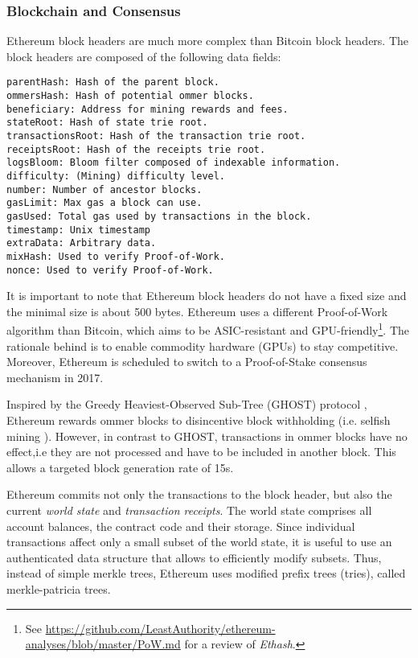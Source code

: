 \subsubsection{Blockchain and Consensus}

Ethereum block headers are much more complex than Bitcoin block headers. The block headers are composed of the following data fields:
\begin{lstlisting}[breaklines]
parentHash: Hash of the parent block.
ommersHash: Hash of potential ommer blocks.
beneficiary: Address for mining rewards and fees.
stateRoot: Hash of state trie root.
transactionsRoot: Hash of the transaction trie root.
receiptsRoot: Hash of the receipts trie root.
logsBloom: Bloom filter composed of indexable information.
difficulty: (Mining) difficulty level.
number: Number of ancestor blocks.
gasLimit: Max gas a block can use.
gasUsed: Total gas used by transactions in the block.
timestamp: Unix timestamp
extraData: Arbitrary data.
mixHash: Used to verify Proof-of-Work.
nonce: Used to verify Proof-of-Work.
\end{lstlisting}
It is important to note that Ethereum block headers do not have a fixed size and the minimal size is about 500 bytes. Ethereum uses a different Proof-of-Work algorithm than Bitcoin, which aims to be ASIC-resistant and GPU-friendly\footnote{See \url{https://github.com/LeastAuthority/ethereum-analyses/blob/master/PoW.md} for a review of \emph{Ethash}.}. The rationale behind is to enable commodity hardware (GPUs) to stay competitive. Moreover, Ethereum is scheduled to switch to a Proof-of-Stake consensus mechanism in 2017. 

Inspired by the Greedy Heaviest-Observed Sub-Tree (GHOST) protocol \parencite{cryptoeprint:2013:881}, Ethereum rewards ommer blocks to disincentive block withholding (i.e. selfish mining \parencite{Eyal2014}). However, in contrast to GHOST, transactions in ommer blocks have no effect,i.e they are not processed and have to be included in another block. This allows a targeted block generation rate of 15s.  

Ethereum commits not only the transactions to the block header, but also the current \emph{world state} and \emph{transaction receipts}. The world state comprises all account balances, the contract code and their storage. Since individual transactions affect only a small subset of the world state, it is useful to use an authenticated data structure that allows to efficiently modify subsets. Thus, instead of simple merkle trees, Ethereum uses modified prefix trees (tries), called merkle-patricia trees.

